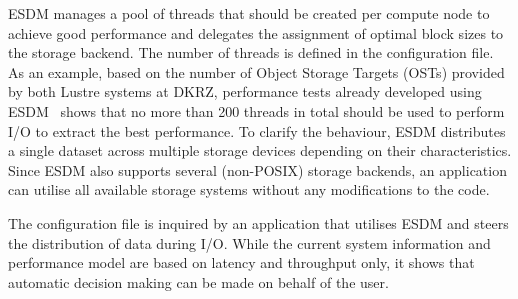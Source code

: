 \documentclass{superfri}
\newcommand{\jk}[1]{\todo[inline]{JK: #1}}
\newcommand{\hh}[1]{\textcolor{blue}{HuangHua: #1}}
\begin{document}


ESDM manages a pool of threads that should be created per compute node to achieve good performance and delegates the assignment of optimal block sizes to the storage backend.
The number of threads is defined in the configuration file.
As an example, based on the number of Object Storage Targets (OSTs) provided by both Lustre systems at DKRZ, performance tests already developed using ESDM~\cite{2019_3361225} shows that no more than 200 threads in total should be used to perform I/O to extract the best performance.
To clarify the behaviour, ESDM distributes a single dataset across multiple storage devices depending on their characteristics.
Since ESDM also supports several (non-POSIX) storage backends, an application can utilise all available storage systems without any modifications to the code.

The configuration file is inquired by an application that utilises ESDM and steers the distribution of data during I/O.
While the current system information and performance model are based on latency and throughput only, it shows that automatic decision making can be made on behalf of the user.
\end{document}
